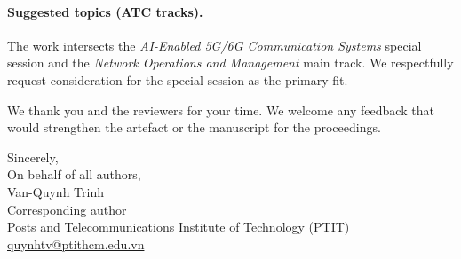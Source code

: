 \documentclass[11pt,a4paper]{article}
\begin{document}
\paragraph{Suggested topics (ATC tracks).} The work intersects the
\emph{AI-Enabled 5G/6G Communication Systems} special session and the
\emph{Network Operations and Management} main track. We respectfully
request consideration for the special session as the primary fit.

\bigskip

We thank you and the reviewers for your time. We welcome any feedback
that would strengthen the artefact or the manuscript for the
proceedings.

\bigskip

\noindent
Sincerely,\\
On behalf of all authors,\\
Van-Quynh Trinh\\
Corresponding author\\
Posts and Telecommunications Institute of Technology (PTIT)\\
\href{mailto:quynhtv@ptithcm.edu.vn}{quynhtv@ptithcm.edu.vn}
\end{document}
